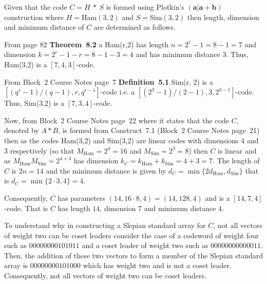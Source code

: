 Given that the code $C = H\ *\ S$ is formed using Plotkin's $(\bm{a}|\bm{a} + \bm{b})$ construction where $H =\textrm{Ham}(3,2)$ and $S =\textrm{Sim}(3,2)$ then length, dimension and minimum distance of $C$ are determined as follows.

From \hill page 82 \textbf{Theorem~8.2} a Ham(r,2) has length $n=2^r - 1 = 8-1=7$ and dimension $k = 2^r-1-r = 8-1-3=4$ and has minimum distance $3$. Thus, Ham(3,2) is a $[7, 4, 3]$-code.

From Block~2 Course Notes page~7 \textbf{Definition~5.1} Sim(r, 2) is a $[(q^r-1)/(q-1),r,q^{r-1}]$-code i.e. a $[(2^3-1)/(2-1),3,2^{3-1}]$-code. Thus, Sim(3,2) is a 
$[7,3,4]$-code.

Now, from Block~2 Course Notes page~22 where it states that the code $C$, denoted by $A*B$, is formed from Construct~7.1 (Block~2 Course Notes page~21) then as the codes Ham(3,2) and Sim(3,2) are linear codes with dimensions $4$ and $3$ respectively (so that $M_{\textrm{Ham}}=2^4=16$ and $M_{\textrm{Sim}}=2^3=8$) then $C$ is linear and as $M_{\textrm{Ham}}M_{\textrm{Sim}}=2^{4+3}$ has dimension $k_C = k_{\textrm{Ham}} + k_{\textrm{Sim}} = 4 + 3 = 7$. The length of $C$ is $2n=14$ and the minimum distance is given by $d_C=\min\{2d_{\textrm{Ham}},d_{\textrm{Sim}}\}$ that is $d_C=\min\{2\cdot3,4\} = 4$. 

Consequently, $C$ has parameters $(14, 16\cdot8, 4)=(14, 128, 4)$ and is a $[14,7,4]$-code. That is $C$ has length $14$, dimension $7$ and minimum distance $4$.

To understand why in constructing a Slepian standard array for $C$, not all vectors of weight two can be coset leaders consider the case of a codeword of weight four such as $0   0   0   0   0   0   0   0   1   0   1   0   1   1$ and a coset leader of weight two such as $0   0   0   0   0   0   0   0   0   0   0   0   1   1$. Then, the addition of these two vectors to form a member of the Slepian standard array is $0   0   0   0   0   0   0   0   1   0   1   0   0   0$ which has weight two and is not a coset leader. Consequently, not all vectors of weight two can be coset leaders.